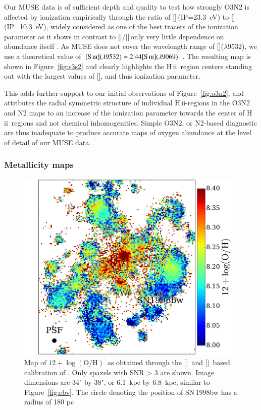 \documentclass[traditabstract]{aa}
\newcommand{\hii}{\mbox{H\,{\sc ii}}}
\newcommand{\oh}{$12+\log(\mathrm{O/H})$}
\newcommand{\sii}{[\ion{S}{ii}]}
\newcommand{\siii}{[\ion{S}{iii}]}
\newcommand{\oii}{[\ion{O}{ii}]}
\newcommand{\oiii}{[\ion{O}{iii}]}
\newcommand{\nii}{[\ion{N}{ii}]}
\begin{document}
Our MUSE data is of sufficient depth and quality to test how strongly O3N2 is affected by ionization empirically through the ratio of \siii\,(IP=23.3~eV) to \sii\,(IP=10.3~eV), widely considered as one of the best tracers of the ionization parameter \citep{1991MNRAS.253..245D} as it shows in contrast to \oiii/\oii\,only very little dependence on abundance itself \citep{2002ApJS..142...35K, 2011MNRAS.415.3616D}. As MUSE does not cover the wavelength range of \siii($\lambda$9532), we use a theoretical value of $\siii(\lambda9532)=2.44\siii(\lambda9069)$ \citep{1982MNRAS.199.1025M}. The resulting map is shown in Figure~\ref{fig:s3s2} and clearly highlights the \hii~region centers standing out with the largest values of \siii, and thus ionization parameter. %

This adds further support to our initial observations of Figure~\ref{fig:o3n2}, and attributes the radial symmetric structure of individual \hii-regions in the O3N2 and N2 maps to an increase of the ionization parameter towards the center of \hii~regions and not chemical inhomogenities. Simple O3N2, or N2-based diagnostic are thus inadequate to produce accurate maps of oxygen abundance at the level of detail of our MUSE data.

\subsubsection{Metallicity maps}
\label{sec:mapoh}

\begin{figure}
\includegraphics[angle=0, width=0.99\columnwidth]{Figs/MUSE_SN1998bw_OH.pdf}
\caption{Map of \oh\, as obtained through the \sii\, and \nii\, based calibration of \citet{2016Ap&SS.361...61D}. Only spaxels with SNR > 3 are shown. Image dimensions are 34" by 38", or 6.1~kpc by 6.8~kpc, similar to Figure~\ref{fig:ebv}. The circle denoting the position of SN\,1998bw has a radius of 180 pc}
\label{fig:s2}
\end{figure}
\end{document}

